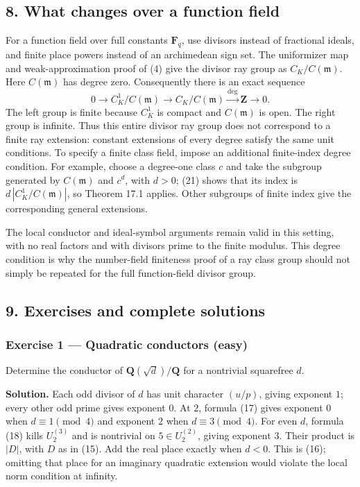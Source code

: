 \documentclass[11pt,a4paper]{article}
\begin{document}
\subsection{8. What changes over a function
field}\label{what-changes-over-a-function-field}

For a function field over full constants \(\mathbf F_q\), use divisors
instead of fractional ideals, and finite place powers instead of an
archimedean sign set. The uniformizer map and weak-approximation proof
of (4) give the divisor ray group as \(C_K/C(\mathfrak m)\). Here
\(C(\mathfrak m)\) has degree zero. Consequently there is an exact
sequence \[
0\longrightarrow C_K^1/C(\mathfrak m)
\longrightarrow C_K/C(\mathfrak m)
\xrightarrow{\deg}\mathbf Z\longrightarrow0.
\tag{21}
\] The left group is finite because \(C_K^1\) is compact and
\(C(\mathfrak m)\) is open. The right group is infinite. Thus this
entire divisor ray group does not correspond to a finite ray extension:
constant extensions of every degree satisfy the same unit conditions. To
specify a finite class field, impose an additional finite-index degree
condition. For example, choose a degree-one class \(c\) and take the
subgroup generated by \(C(\mathfrak m)\) and \(c^d\), with \(d>0\); (21)
shows that its index is \(d\,|C_K^1/C(\mathfrak m)|\), so Theorem 17.1
applies. Other subgroups of finite index give the corresponding general
extensions.

The local conductor and ideal-symbol arguments remain valid in this
setting, with no real factors and with divisors prime to the finite
modulus. This degree condition is why the number-field finiteness proof
of a ray class group should not simply be repeated for the full
function-field divisor group.

\subsection{9. Exercises and complete
solutions}\label{exercises-and-complete-solutions}

\subsubsection{Exercise 1 --- Quadratic conductors
(easy)}\label{exercise-1-quadratic-conductors-easy}

Determine the conductor of \(\mathbf Q(\sqrt d)/\mathbf Q\) for a
nontrivial squarefree \(d\).

\textbf{Solution.} Each odd divisor of \(d\) has unit character
\((u/p)\), giving exponent \(1\); every other odd prime gives exponent
\(0\). At \(2\), formula (17) gives exponent \(0\) when
\(d\equiv1\pmod4\) and exponent \(2\) when \(d\equiv3\pmod4\). For even
\(d\), formula (18) kills \(U_2^{(3)}\) and is nontrivial on
\(5\in U_2^{(2)}\), giving exponent \(3\). Their product is \(|D|\),
with \(D\) as in (15). Add the real place exactly when \(d<0\). This is
(16); omitting that place for an imaginary quadratic extension would
violate the local norm condition at infinity.
\end{document}
